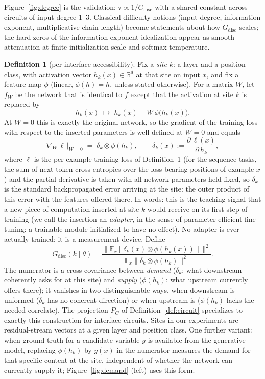\documentclass[10pt]{article}
\theoremstyle{definition}
\newtheorem{definition}{Definition}
\begin{document}
Figure~\ref{fig:degree} is the validation: $\tau \propto 1/G_{\mathrm{disc}}$ with a shared constant across circuits of input degree 1--3. Classical difficulty notions (input degree, information exponent, multiplicative chain length) become statements about how $G_{\mathrm{disc}}$ scales; the hard zeros of the information-exponent idealization appear as smooth attenuation at finite initialization scale and softmax temperature.

\begin{definition}[per-interface accessibility]\label{def:interface}
Fix a \emph{site} $k$: a layer and a position class, with activation vector $h_k(x) \in \mathbb{R}^d$ at that site on input $x$, and fix a feature map $\phi$ (linear, $\phi(h) = h$, unless stated otherwise). For a matrix $W$, let $f_W$ be the network that is identical to $f$ except that the activation at site $k$ is replaced by
$$h_k(x) \;\longmapsto\; h_k(x) + W\, \phi\big(h_k(x)\big).$$
At $W = 0$ this is exactly the original network, so the gradient of the training loss with respect to the inserted parameters is well defined at $W=0$ and equals
$$\nabla_W\, \ell\, \big|_{W=0} \;=\; \delta_k \otimes \phi(h_k), \qquad \delta_k(x) := \frac{\partial\, \ell(x)}{\partial\, h_k},$$
where $\ell$ is the per-example training loss of Definition~1 (for the sequence tasks, the sum of next-token cross-entropies over the loss-bearing positions of example $x$) and the partial derivative is taken with all network parameters held fixed, so $\delta_k$ is the standard backpropagated error arriving at the site:
the outer product of this error with the features offered there. In words: this is the teaching signal that a new piece of computation inserted at site $k$ would receive on its first step of training (we call the insertion an \emph{adapter}, in the sense of parameter-efficient fine-tuning: a trainable module initialized to have no effect). No adapter is ever actually trained; it is a measurement device. Define
$$G_{\mathrm{disc}}(k \mid \theta) = \frac{\big\| \mathbb{E}_x[\, \delta_k(x) \otimes \phi(h_k(x))\,] \big\|^2}{\mathbb{E}_x \big\| \delta_k \otimes \phi(h_k) \big\|^2}.$$
The numerator is a cross-covariance between \emph{demand} ($\delta_k$: what downstream coherently asks for at this site) and \emph{supply} ($\phi(h_k)$: what upstream currently offers there); it vanishes in two distinguishable ways, when downstream is unformed ($\delta_k$ has no coherent direction) or when upstream is ($\phi(h_k)$ lacks the needed correlate). The projection $P_C$ of Definition~\ref{def:circuit} specializes to exactly this construction for interface circuits. Sites in our experiments are residual-stream vectors at a given layer and position class. One further variant: when ground truth for a candidate variable $y$ is available from the generative model, replacing $\phi(h_k)$ by $y(x)$ in the numerator measures the demand for that specific content at the site, independent of whether the network can currently supply it; Figure~\ref{fig:demand} (left) uses this form.
\end{definition}
\end{document}
